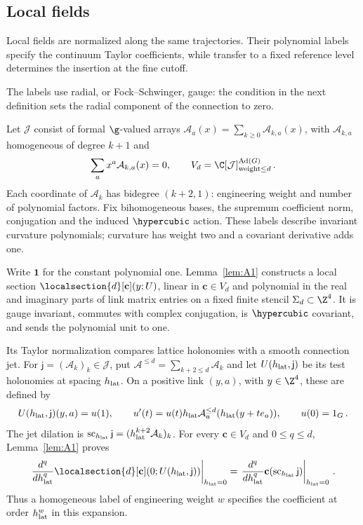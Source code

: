 \subsection{Local fields}

Local fields are normalized along the same trajectories. Their polynomial labels specify the continuum Taylor coefficients, while transfer to a fixed reference level determines the insertion at the fine cutoff.

The labels use radial, or Fock--Schwinger, gauge: the condition in the next definition sets the radial component of the connection to zero.

\begin{definition}\label{def:D07}
Let $\mathcal J$ consist of formal $\g$-valued arrays $\mathcal A_a(x)=\sum_{k\ge0}\mathcal A_{k,a}(x)$, with $\mathcal A_{k,a}$ homogeneous of degree $k+1$ and
\begin{equation*}
\sum_a x^a\mathcal A_{k,a}(x)=0,\qquad
V_d=\C[\mathcal J]^{\operatorname{Ad}(G)}_{\mathrm{weight}\le d}\,.
\end{equation*}
Each coordinate of $\mathcal A_k$ has bidegree $(k+2,1)$: engineering weight and number of polynomial factors. Fix bihomogeneous bases, the supremum coefficient norm, conjugation and the induced $\hypercubic$ action. These labels describe invariant curvature polynomials; curvature has weight two and a covariant derivative adds one.
\end{definition}

Write $\mathbf1$ for the constant polynomial one. Lemma~\ref{lem:A1} constructs a local section $\localsection{d}[\mathbf c](y;U)$, linear in $\mathbf c\in V_d$ and polynomial in the real and imaginary parts of link matrix entries on a fixed finite stencil $\Sigma_d\subset\Z^4$. It is gauge invariant, commutes with complex conjugation, is $\hypercubic$ covariant, and sends the polynomial unit to one.

Its Taylor normalization compares lattice holonomies with a smooth connection jet. For $\mathsf j=(\mathcal A_k)_k\in\mathcal J$, put $\mathcal A^{\le d}=\sum_{k+2\le d}\mathcal A_k$ and let $U(h_{\rm lat},\mathsf j)$ be its test holonomies at spacing $h_{\rm lat}$. On a positive link $(y,a)$, with $y\in\Z^4$, these are defined by
\begin{equation}\label{eq:I12-test-holonomy}
U(h_{\rm lat},\mathsf j)(y,a)=u(1),\qquad
u'(t)=u(t)h_{\rm lat}\mathcal A_a^{\le d}(h_{\rm lat}(y+te_a)),\qquad u(0)=1_G\,.
\end{equation}
The jet dilation is $\operatorname{sc}_{h_{\rm lat}}\mathsf j=(h_{\rm lat}^{k+2}\mathcal A_k)_k$. For every $\mathbf c\in V_d$ and $0\le q\le d$, Lemma~\ref{lem:A1} proves
\begin{equation}\label{eq:I12-section-Taylor}
\left.\frac{d^q}{dh_{\rm lat}^q}\localsection{d}[\mathbf c](0;U(h_{\rm lat},\mathsf j))\right|_{h_{\rm lat}=0}
=\left.\frac{d^q}{dh_{\rm lat}^q}\mathbf c(\operatorname{sc}_{h_{\rm lat}}\mathsf j)\right|_{h_{\rm lat}=0}\,.
\end{equation}
Thus a homogeneous label of engineering weight $w$ specifies the coefficient at order $h_{\rm lat}^w$ in this expansion.

